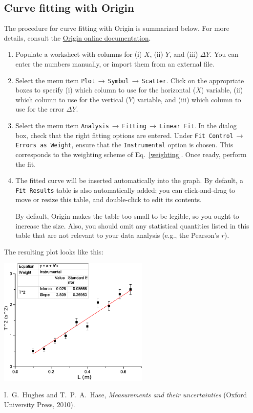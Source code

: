 \documentclass[11pt,a4paper]{article}
\begin{document}
\subsection{Curve fitting with Origin}

The procedure for curve fitting with Origin is summarized below.
For more details, consult the
\href{https://www.originlab.com/doc/Origin-Help/Linear-Polynomial-Regression}{Origin
  online documentation}.

\begin{enumerate}
\item Populate a worksheet with columns for (i) $X$, (ii) $Y$, and
  (iii) $\Delta Y$.  You can enter the numbers manually, or import
  them from an external file.

\item Select the menu item
  \texttt{Plot$\,\rightarrow\,$Symbol$\,\rightarrow\,$Scatter}.  Click on the
  appropriate boxes to specify (i) which column to use for the
  horizontal ($X$) variable, (ii) which column to use for the vertical
  ($Y$) variable, and (iii) which column to use for the error $\Delta
  Y$.

\item Select the menu item
  \texttt{Analysis$\,\rightarrow\,$Fitting$\,\rightarrow\,$Linear
    Fit}.  In the dialog box, check that the right fitting options are
  entered.  Under \texttt{Fit Control$\,\rightarrow\,$Errors as
    Weight}, ensure that the \texttt{Instrumental} option is chosen.
  This corresponds to the weighting scheme of Eq.~\eqref{weighting}.
  Once ready, perform the fit.

\item The fitted curve will be inserted automatically into the graph.
  By default, a \texttt{Fit Results} table is also automatically
  added; you can click-and-drag to move or resize this table, and
  double-click to edit its contents.

  By default, Origin makes the table too small to be legible, so you
  ought to increase the size.  Also, you should omit any statistical
  quantities listed in this table that are not relevant to your data
  analysis (e.g., the Pearson's $r$).
\end{enumerate}
The resulting plot looks like this:
\begin{center}
  \includegraphics[width=0.56\textwidth]{origin.png}
\end{center}


\begin{thebibliography}{99}
 I.~G.~Hughes and T.~P.~A.~Hase, \textit{Measurements
  and their uncertainties} (Oxford University Press, 2010).
\end{thebibliography}
\end{document}
